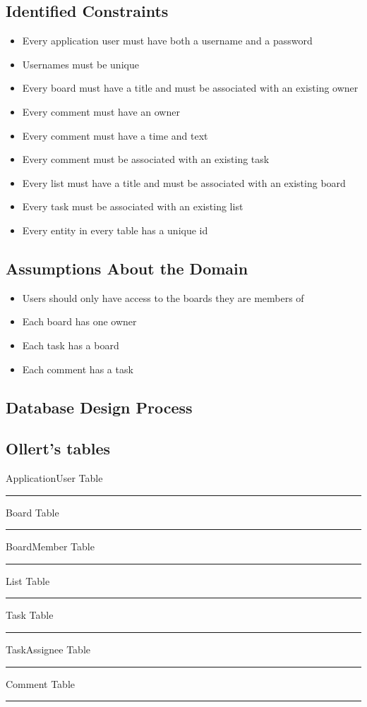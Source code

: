 \documentclass[letterpaper]{article}
\begin{document}
\subsection{Identified Constraints}
\begin{itemize}
  \item{Every application user must have both a username and a password}
  \item{Usernames must be unique}
  \item{Every board must have a title and must be associated with an existing owner}
  \item{Every comment must have an owner}
  \item{Every comment must have a time and text}
  \item{Every comment must be associated with an existing task}
  \item{Every list must have a title and must be associated with an existing board}
  \item{Every task must be associated with an existing list}
  \item{Every entity in every table has a unique id}
\end{itemize}


\subsection{Assumptions About the Domain}
  \begin{itemize}
    \item Users should only have access to the boards they are members of
    \item Each board has one owner
    \item Each task has a board
    \item Each comment has a task
  \end{itemize}

\subsection{Database Design Process}

\subsection{Ollert's tables}
ApplicationUser Table
\hrule
Board Table
\hrule
BoardMember Table
\hrule
List Table
\hrule
Task Table
\hrule
TaskAssignee Table
\hrule
Comment Table
\hrule
\end{document}
